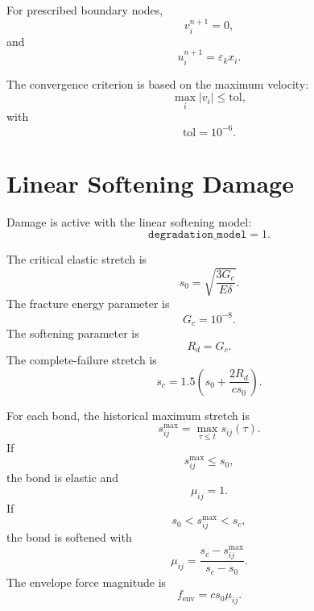 \documentclass[11pt]{article}
\begin{document}
For prescribed boundary nodes,
\begin{equation}
v_i^{n+1}=0,
\end{equation}
and
\begin{equation}
u_i^{n+1}=\varepsilon_k x_i.
\end{equation}

The convergence criterion is based on the maximum velocity:
\begin{equation}
\max_i |v_i| \le \mathrm{tol},
\end{equation}
with
\begin{equation}
\mathrm{tol}=10^{-6}.
\end{equation}

\section{Linear Softening Damage}

Damage is active with the linear softening model:
\begin{equation}
\texttt{degradation\_model}=1.
\end{equation}

The critical elastic stretch is
\begin{equation}
s_0
=
\sqrt{
\frac{3G_c}{E\delta}
}.
\end{equation}
The fracture energy parameter is
\begin{equation}
G_c = 10^{-8}.
\end{equation}
The softening parameter is
\begin{equation}
R_d = G_c.
\end{equation}
The complete-failure stretch is
\begin{equation}
s_c
=
1.5
\left(
s_0
+
\frac{2R_d}{cs_0}
\right).
\end{equation}

For each bond, the historical maximum stretch is
\begin{equation}
s_{ij}^{\max}
=
\max_{\tau\le t}s_{ij}(\tau).
\end{equation}
If
\begin{equation}
s_{ij}^{\max} \le s_0,
\end{equation}
the bond is elastic and
\begin{equation}
\mu_{ij}=1.
\end{equation}
If
\begin{equation}
s_0 < s_{ij}^{\max} < s_c,
\end{equation}
the bond is softened with
\begin{equation}
\mu_{ij}
=
\frac{s_c-s_{ij}^{\max}}{s_c-s_0}.
\end{equation}
The envelope force magnitude is
\begin{equation}
f_{\mathrm{env}}
=
cs_0\mu_{ij}.
\end{equation}
\end{document}
